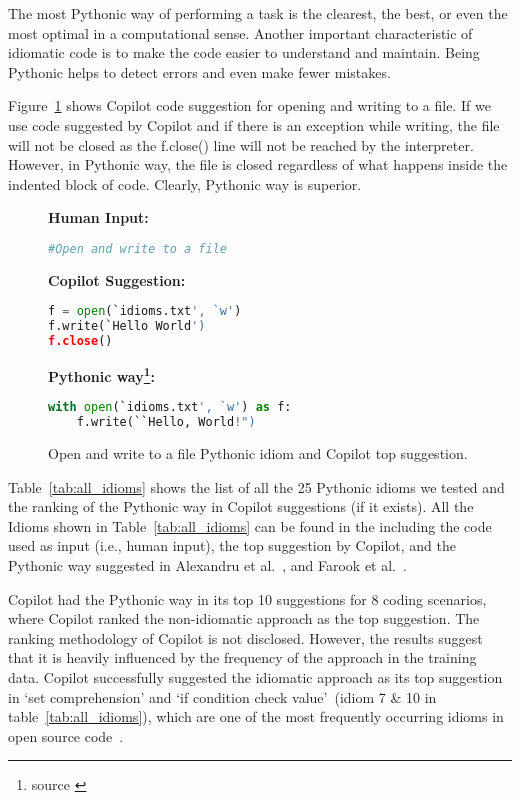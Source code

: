 The most Pythonic way of performing a task is the clearest, the best, or even the most optimal in a computational sense.
Another important characteristic of idiomatic code is to make the code easier to understand and maintain. Being Pythonic helps to detect errors and even make fewer mistakes.

Figure~\ref{fig:idioms_2} shows Copilot code suggestion for opening and writing to a file. 
If we use code suggested by Copilot and if there is an exception while writing, the file will not be closed as the f.close() line will not be reached by the interpreter.
However, in Pythonic way, the file is closed regardless of what happens inside the indented block of code. Clearly, Pythonic way is superior.

\begin{figure}[hbt!]
    \centering
\begin{tcolorbox}[title=Open and write to a file,boxsep=.25mm]
\textbf{Human Input:}
\begin{lstlisting}[language={Python}]
#Open and write to a file
\end{lstlisting}
\tcbline
\textbf{Copilot Suggestion:}
\begin{lstlisting}[language=Python,escapechar=\%]
f = open(`idioms.txt', `w')
f.write(`Hello World')
f.close()
\end{lstlisting}
\tcbline
\textbf{Pythonic way\footnote{source \cite{Alexandru2018}}:}
\begin{lstlisting}[language=Python]
with open(`idioms.txt', `w') as f:
    f.write(``Hello, World!")
\end{lstlisting}
\end{tcolorbox}
    \caption{Open and write to a file Pythonic idiom and Copilot top suggestion.}
    \label{fig:idioms_2}
\end{figure}

Table~\ref{tab:all_idioms} shows the list of all the 25 Pythonic idioms we tested and the ranking of the Pythonic way in Copilot suggestions (if it exists).
All the Idioms shown in Table~\ref{tab:all_idioms} can be found in the \repl{} including the code used as input (i.e., human input), the top suggestion by Copilot, and the Pythonic way suggested in Alexandru et al.~\cite{Alexandru2018}, and Farook et al.~\cite{idioms}.

Copilot had the Pythonic way in its top 10 suggestions for 8 coding scenarios, where Copilot ranked the non-idiomatic approach as the top suggestion. 
The ranking methodology of Copilot is not disclosed. However, the results suggest that it is heavily influenced by the frequency of the approach in the training data. 
Copilot successfully suggested the idiomatic approach as its top suggestion in `set comprehension' and `if condition check value'~(idiom 7 \& 10 in table~\ref{tab:all_idioms}), which are one of the most frequently occurring idioms in open source code~\cite{Alexandru2018}.


